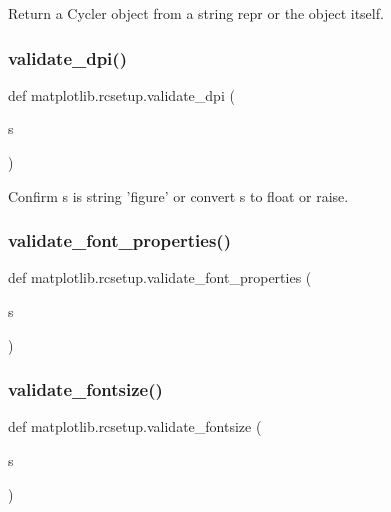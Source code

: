 \begin{DoxyVerb}Return a Cycler object from a string repr or the object itself.\end{DoxyVerb}
 \mbox{\label{namespacematplotlib_1_1rcsetup_adc9339aa98da572a1ddc55f587b77da1}} 
\subsubsection{\texorpdfstring{validate\+\_\+dpi()}{validate\_dpi()}}
{\footnotesize\ttfamily def matplotlib.\+rcsetup.\+validate\+\_\+dpi (\begin{DoxyParamCaption}\item[{}]{s }\end{DoxyParamCaption})}

\begin{DoxyVerb}Confirm s is string 'figure' or convert s to float or raise.\end{DoxyVerb}
 \mbox{\label{namespacematplotlib_1_1rcsetup_afc92d7a6e116c6ac56f9c6b52abf96e3}} 
\subsubsection{\texorpdfstring{validate\+\_\+font\+\_\+properties()}{validate\_font\_properties()}}
{\footnotesize\ttfamily def matplotlib.\+rcsetup.\+validate\+\_\+font\+\_\+properties (\begin{DoxyParamCaption}\item[{}]{s }\end{DoxyParamCaption})}

\mbox{\label{namespacematplotlib_1_1rcsetup_a8ff8e45ef91782aa06ecb72b2e70ddbc}} 
\subsubsection{\texorpdfstring{validate\+\_\+fontsize()}{validate\_fontsize()}}
{\footnotesize\ttfamily def matplotlib.\+rcsetup.\+validate\+\_\+fontsize (\begin{DoxyParamCaption}\item[{}]{s }\end{DoxyParamCaption})}

